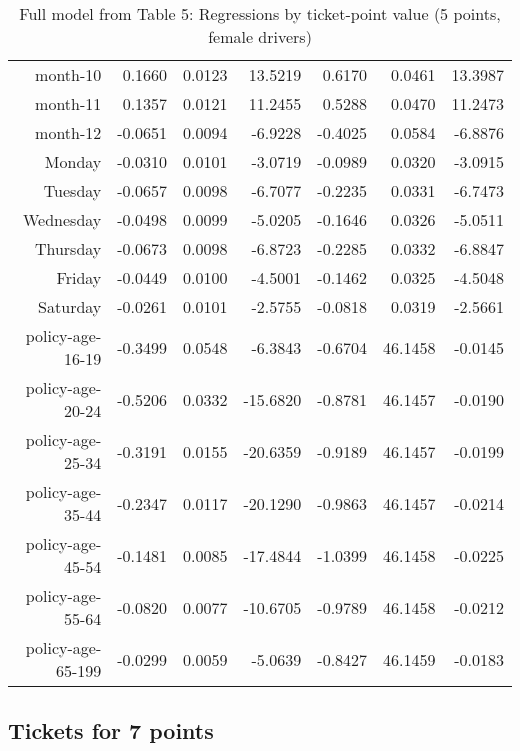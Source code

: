 \documentclass[10pt]{article}
\begin{document}
\begin{table}[ht]
\begin{tabular}{rrrrrrr}
  month-10 & 0.1660 & 0.0123 & 13.5219 & 0.6170 & 0.0461 & 13.3987 \\ 
  month-11 & 0.1357 & 0.0121 & 11.2455 & 0.5288 & 0.0470 & 11.2473 \\ 
  month-12 & -0.0651 & 0.0094 & -6.9228 & -0.4025 & 0.0584 & -6.8876 \\ 
  Monday & -0.0310 & 0.0101 & -3.0719 & -0.0989 & 0.0320 & -3.0915 \\ 
  Tuesday & -0.0657 & 0.0098 & -6.7077 & -0.2235 & 0.0331 & -6.7473 \\ 
  Wednesday & -0.0498 & 0.0099 & -5.0205 & -0.1646 & 0.0326 & -5.0511 \\ 
  Thursday & -0.0673 & 0.0098 & -6.8723 & -0.2285 & 0.0332 & -6.8847 \\ 
  Friday & -0.0449 & 0.0100 & -4.5001 & -0.1462 & 0.0325 & -4.5048 \\ 
  Saturday & -0.0261 & 0.0101 & -2.5755 & -0.0818 & 0.0319 & -2.5661 \\ 
  policy-age-16-19 & -0.3499 & 0.0548 & -6.3843 & -0.6704 & 46.1458 & -0.0145 \\ 
  policy-age-20-24 & -0.5206 & 0.0332 & -15.6820 & -0.8781 & 46.1457 & -0.0190 \\ 
  policy-age-25-34 & -0.3191 & 0.0155 & -20.6359 & -0.9189 & 46.1457 & -0.0199 \\ 
  policy-age-35-44 & -0.2347 & 0.0117 & -20.1290 & -0.9863 & 46.1457 & -0.0214 \\ 
  policy-age-45-54 & -0.1481 & 0.0085 & -17.4844 & -1.0399 & 46.1458 & -0.0225 \\ 
  policy-age-55-64 & -0.0820 & 0.0077 & -10.6705 & -0.9789 & 46.1458 & -0.0212 \\ 
  policy-age-65-199 & -0.0299 & 0.0059 & -5.0639 & -0.8427 & 46.1459 & -0.0183 \\ 
   \hline
\end{tabular}
\caption{Full model from Table 5: Regressions by ticket-point value (5 points, female drivers)} 
\label{tab_5_5_pts_F}
\end{table}


\clearpage
\pagebreak




\subsection*{Tickets for 7 points}
\end{document}
